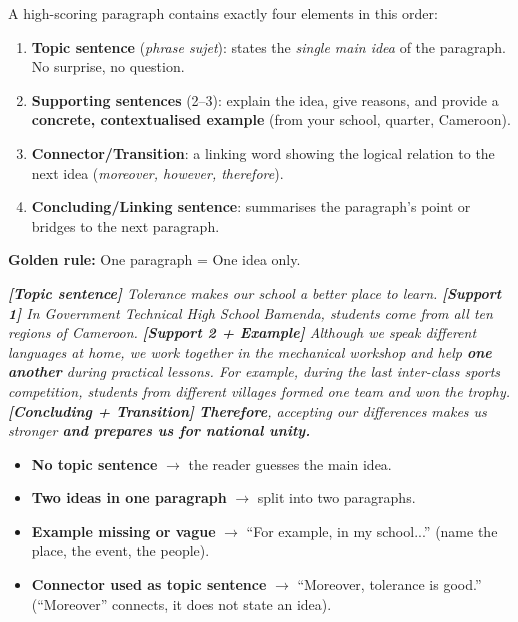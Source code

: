 \documentclass[11pt]{article}
\begin{document}
\begin{propriete}
A high-scoring paragraph contains exactly four elements in this order:
\begin{enumerate}
\item \textbf{Topic sentence} (\emph{phrase sujet}): states the \emph{single main idea} of the paragraph. No surprise, no question.
\item \textbf{Supporting sentences} (2--3): explain the idea, give reasons, and provide a \textbf{concrete, contextualised example} (from your school, quarter, Cameroon).
\item \textbf{Connector/Transition}: a linking word showing the logical relation to the next idea (\emph{moreover, however, therefore}).
\item \textbf{Concluding/Linking sentence}: summarises the paragraph's point or bridges to the next paragraph.
\end{enumerate}
\textbf{Golden rule:} One paragraph = One idea only.
\end{propriete}

\begin{exemplebox}
\emph{\textbf{[Topic sentence]} Tolerance makes our school a better place to learn.} \emph{\textbf{[Support 1]} In Government Technical High School Bamenda, students come from all ten regions of Cameroon.} \emph{\textbf{[Support 2 + Example]} Although we speak different languages at home, we work together in the mechanical workshop and help \textbf{one another} during practical lessons. For example, during the last inter-class sports competition, students from different villages formed one team and won the trophy.} \emph{\textbf{[Concluding + Transition]} \textbf{Therefore}, accepting our differences makes us stronger \textbf{and prepares us for national unity.}}
\end{exemplebox}

\begin{attention}
\begin{itemize}
\item \textbf{No topic sentence} $\rightarrow$ the reader guesses the main idea.
\item \textbf{Two ideas in one paragraph} $\rightarrow$ split into two paragraphs.
\item \textbf{Example missing or vague} $\rightarrow$ ``For example, in my school...'' (name the place, the event, the people).
\item \textbf{Connector used as topic sentence} $\rightarrow$ ``Moreover, tolerance is good.'' (``Moreover'' connects, it does not state an idea).
\end{itemize}
\end{attention}
\end{document}
